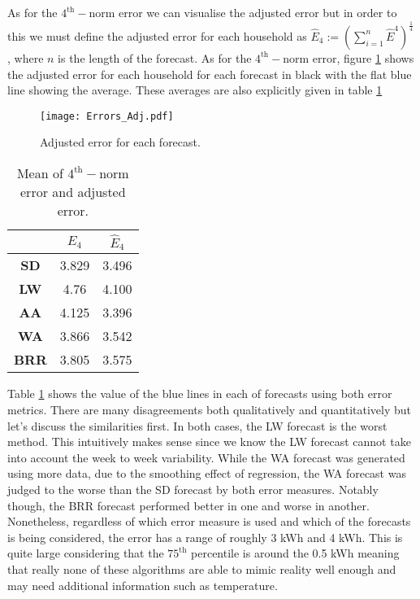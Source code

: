 As for the $4^{\text{th}}-$norm error we can visualise the adjusted error but in order to this we must define the adjusted error for each household as $\hat{E}_4 := \left( \sum_{i=1}^{n} \hat{E}^4\right)^{\frac{1}{4}}$, where $n$ is the length of the forecast. As for the $4^{\text{th}}-$norm error, figure \ref{fig:Adj_err_all} shows the adjusted error for each household for each forecast in black with the flat blue line showing the average. These averages are also explicitly given in table \ref{tab:errs}

\begin{figure}
\centering
\texttt{[image: Errors\_Adj.pdf]}
\caption{\label{fig:Adj_err_all} Adjusted error for each forecast.}
\end{figure}


\begin{table}
\centering
\begin{tabular}{|c|c|c|}
\hline
 & $E_4$ & $\hat{E}_4$ \\
 \hline
\textbf{SD} & 3.829 & 3.496 \\
\textbf{LW} & 4.76 & 4.100 \\ 
\textbf{AA} & 4.125 & 3.396 \\ 
\textbf{WA} & 3.866 & 3.542 \\ 
\textbf{BRR} & 3.805 & 3.575 \\
\hline
\end{tabular}
\caption{Mean of $4^{\text{th}}-$norm error and adjusted error.}
\label{tab:errs}
\end{table}


Table \ref{tab:errs} shows the value of the blue lines in each of forecasts using both error metrics. There are many disagreements both qualitatively and quantitatively but let's discuss the similarities first. In both cases, the LW forecast is the worst method. This intuitively makes sense since we know the LW forecast cannot take into account the week to week variability. While the WA forecast was generated using more data, due to the smoothing effect of regression, the WA forecast was judged to the worse than the SD forecast by both error measures. Notably though, the BRR forecast performed better in one and worse in another. Nonetheless, regardless of which error measure is used and which of the forecasts is being considered, the error has a range of roughly 3 kWh and 4 kWh. This is quite large considering that the $75^{\text{th}}$ percentile is around the 0.5 kWh meaning that really none of these algorithms are able to mimic reality well enough and may need additional information such as temperature.

